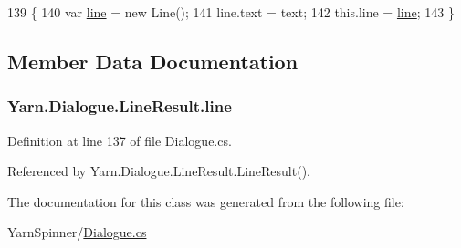 \begin{DoxyCode}
139                                             \{
140                 var \hyperlink{a00126_abfbb0ea840b02acd0ecdc72c5b120257}{line} = \textcolor{keyword}{new} Line();
141                 line.text = text;
142                 this.line = \hyperlink{a00126_abfbb0ea840b02acd0ecdc72c5b120257}{line};
143             \}
\end{DoxyCode}


\subsection{Member Data Documentation}
\hypertarget{a00126_abfbb0ea840b02acd0ecdc72c5b120257}{
\subsubsection[{line}]{ Yarn.\-Dialogue.\-Line\-Result.\-line}}\label{a00126_abfbb0ea840b02acd0ecdc72c5b120257}


Definition at line 137 of file Dialogue.\-cs.



Referenced by Yarn.\-Dialogue.\-Line\-Result.\-Line\-Result().



The documentation for this class was generated from the following file\-:\begin{DoxyCompactItemize}
\item 
Yarn\-Spinner/\hyperlink{a00296}{Dialogue.\-cs}\end{DoxyCompactItemize}

